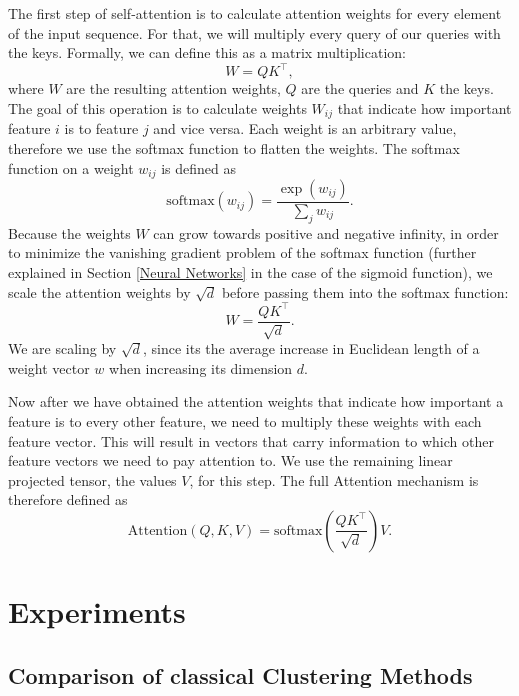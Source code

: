 The first step of self-attention is to calculate attention weights for every element of the input sequence. For that, we will multiply every query of our queries with the keys. Formally, we can define this as a matrix multiplication:
$$W = QK^\intercal,$$
where $W$ are the resulting attention weights, $Q$ are the queries and $K$ the keys. The goal of this operation is to calculate weights $W_{ij}$ that indicate how important feature $i$ is to feature $j$ and vice versa. Each weight is an arbitrary value, therefore we use the softmax function \cite{neural_networks_pattern_recognition} to flatten the weights. The softmax function on a weight $w_{ij}$ is defined as
$$\text{softmax}(w_{ij}) = \frac{\exp(w_{ij})}{\sum_j{w_{ij}}}.$$
Because the weights $W$ can grow towards positive and negative infinity, in order to minimize the vanishing gradient problem of the softmax function (further explained in Section \ref{Neural Networks} in the case of the sigmoid function), we scale the attention weights by $\sqrt{d}$ before passing them into the softmax function:
$$W = \frac{QK^\intercal}{\sqrt{d}}.$$
We are scaling by $\sqrt{d}$, since its the average increase in Euclidean length of a weight vector $w$ when increasing its dimension $d$. \cite{attention_is_all_you_need}

Now after we have obtained the attention weights that indicate how important a feature is to every other feature, we need to multiply these weights with each feature vector. This will result in vectors that carry information to which other feature vectors we need to pay attention to. We use the remaining linear projected tensor, the values $V$, for this step. The full Attention mechanism is therefore defined as
$$\text{Attention}(Q, K, V) = \text{softmax}(\frac{QK^\intercal}{\sqrt{d}})V.$$





\chapter{Experiments} \label{Experiments}

\section{Comparison of classical Clustering Methods}

